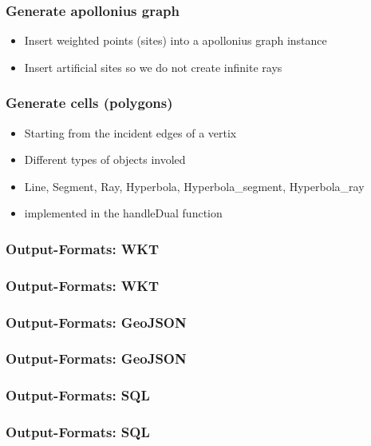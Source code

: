 \documentclass{beamer}
\begin{document}
\begin{frame}
    \frametitle{Generate apollonius graph}
    \begin{itemize}
        \item Insert weighted points (sites) into a apollonius graph instance
        \item Insert artificial sites so we do not create infinite rays
    \end{itemize}
\end{frame}

\begin{frame}
    \frametitle{Generate cells (polygons)}
    \begin{itemize}
        \item Starting from the incident edges of a vertix
        \item Different types of objects involed
        \item Line, Segment, Ray, Hyperbola, Hyperbola\_segment, Hyperbola\_ray
        \item implemented in the handleDual function
    \end{itemize}
\end{frame}

\begin{frame}
    \frametitle{Output-Formats: WKT}
    
\end{frame}

\begin{frame}
    \frametitle{Output-Formats: WKT}
    
\end{frame}

\begin{frame}
    \frametitle{Output-Formats: GeoJSON}
    
\end{frame}

\begin{frame}
    \frametitle{Output-Formats: GeoJSON}
    
\end{frame}

\begin{frame}
    \frametitle{Output-Formats: SQL}
    
\end{frame}

\begin{frame}
    \frametitle{Output-Formats: SQL}
    
\end{frame}
\end{document}
